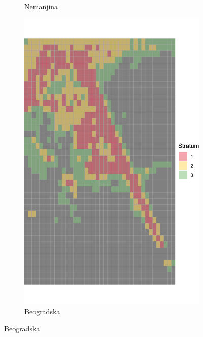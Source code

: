 \documentclass[a4paper,12pt]{article}
\begin{document}
\begin{figure}[H]
\begin{subfigure}[b]{0.3\textwidth}
	  \caption{Nemanjina}
	  \label{fig:nemanjina}
	\end{subfigure}
	\hfill
	\begin{subfigure}[b]{0.3\textwidth}
		\centering
		\includegraphics[width=\textwidth]{../outputs/grid_output/strata_viz/beogradska_strata.png}
		\caption{Beogradska}
		\label{fig:beogradska}
	\end{subfigure}
  
	\vspace{0.3cm} %
  

\end{figure}
\end{document}
